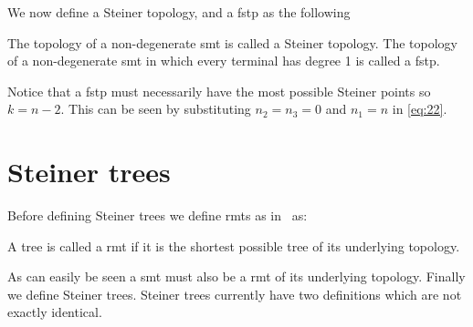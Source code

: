We now define a Steiner topology, and a \ac{fstp} as the following
%
\begin{definition}
The topology of a non-degenerate \ac{smt} is called a Steiner topology. The
topology of a non-degenerate \ac{smt} in which every terminal has degree 1 is
called a \acl{fstp}.
\end{definition}
%
Notice that a \ac{fstp} must necessarily have the most possible Steiner points
so $ k = n - 2$. This can be seen by substituting $n_2 = n_3 = 0$ and $n_1 = n$
in \cref{eq:22}.

\section{Steiner trees}
\label{sec:steiner-trees}

Before defining Steiner trees we define \acp{rmt} as in~\cite{gilbert1968}
as:
%
\begin{definition}
  A tree is called a \acl{rmt} if it is the shortest possible tree of its
  underlying topology.
\end{definition}
%
As can easily be seen a \ac{smt} must also be a \ac{rmt} of its underlying
topology. Finally we define Steiner trees. Steiner trees currently have two definitions
which are not exactly identical.

